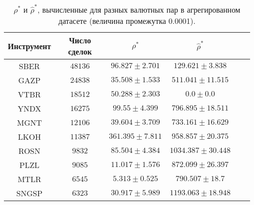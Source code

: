 
\begin{table}[h!]
    \begin{center}
        \begin{tabular}{|c|c|c|c|c|c|}
            \hline
            Инструмент & Число сделок & $\rho^*$ & $\hat \rho^*$                \\ \hline
            SBER & $48136$ & $96.827 \pm 2.701$ & $129.621 \pm 3.838$ \\ \hline
            GAZP       & $24838$      & $35.508 \pm 1.533$  & $511.041 \pm 11.515$  \\ \hline
            VTBR       & $18512$      & $50.288 \pm 2.303$  & $0.0 \pm 0.0$         \\ \hline
            YNDX       & $16275$      & $99.55 \pm 4.399$   & $796.895 \pm 18.511$  \\ \hline
            MGNT       & $12106$      & $39.604 \pm 3.709$  & $733.161 \pm 16.629$  \\ \hline
            LKOH       & $11387$      & $361.395 \pm 7.811$ & $958.857 \pm 20.375$  \\ \hline
            ROSN       & $9832$       & $85.504 \pm 4.384$  & $1034.387 \pm 30.448$ \\ \hline
            PLZL       & $9085$       & $11.017 \pm 1.576$  & $872.099 \pm 26.397$  \\ \hline
            MTLR       & $6545$       & $5.313 \pm 0.525$   & $790.507 \pm 18.7$    \\ \hline
            SNGSP      & $6323$       & $30.917 \pm 5.989$  & $1193.063 \pm 18.948$ \\ \hline
        \end{tabular}
    \end{center}\caption{$\rho^*$ и $\hat \rho^*$, вычисленные для разных валютных пар в агрегированном датасете (величина промежутка 0.0001).}
    \label{Aggreg1CU0.0001} \end{table}

